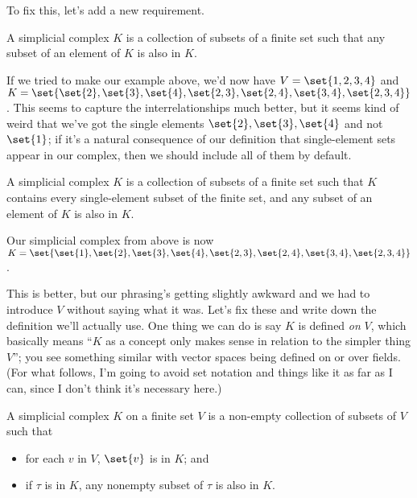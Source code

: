 \documentclass{lec}
\begin{document}
    To fix this, let's add a new requirement.

    \begin{wipdefinition}
        A simplicial complex $K$ is a collection of subsets of a finite set such that any subset of an element of $K$ is also in $K$.
    \end{wipdefinition}

    If we tried to make our example above, we'd now have $V = \set{1, 2, 3, 4}$ and \\ $K = \set{\set{2}, \set{3}, \set{4}, \set{2, 3}, \set{2, 4}, \set{3, 4}, \set{2, 3, 4}}$. This seems to capture the interrelationships much better, but it seems kind of weird that we've got the single elements $\set{2}, \set{3}, \set{4}$ and not $\set{1}$; if it's a natural consequence of our definition that single-element sets appear in our complex, then we should include all of them by default.

    \begin{wipdefinition}
        A simplicial complex $K$ is a collection of subsets of a finite set such that $K$ contains every single-element subset of the finite set, and any subset of an element of $K$ is also in $K$.
    \end{wipdefinition}

    Our simplicial complex from above is now $K = \set{\set{1}, \set{2}, \set{3}, \set{4}, \set{2, 3}, \set{2, 4}, \set{3, 4}, \set{2, 3, 4}}$.

    This is better, but our phrasing's getting slightly awkward and we had to introduce $V$ without saying what it was. Let's fix these and write down the definition we'll actually use. One thing we can do is say $K$ is defined \textit{on} $V$, which basically means ``$K$ as a concept only makes sense in relation to the simpler thing $V$''; you see something similar with vector spaces being defined on or over fields. (For what follows, I'm going to avoid set notation and things like it as far as I can, since I don't think it's necessary here.)

    \begin{definition}
        A simplicial complex $K$ on a finite set $V$ is a non-empty collection of subsets of $V$ such that
        \begin{itemize}
            \item for each $v$ in $V$, $\set{v}$ is in $K$; and
            \item if $\tau$ is in $K$, any nonempty subset of $\tau$ is also in $K$.
        \end{itemize}
    \end{definition}
\end{document}
